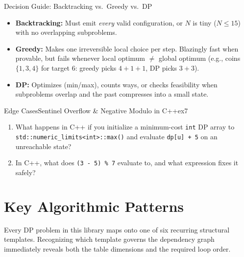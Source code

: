 \documentclass[11pt,a4paper]{article}
\theoremstyle{definition}
\begin{document}
\begin{calloutbox}{Decision Guide: Backtracking vs.\ Greedy vs.\ DP}
\begin{itemize}
    \item \textbf{Backtracking:} Must emit \emph{every} valid configuration, or $N$ is tiny ($N \le 15$) with no overlapping subproblems.
    \item \textbf{Greedy:} Makes one irreversible local choice per step. Blazingly fast when provable, but fails whenever local optimum $\neq$ global optimum (e.g., coins $\{1, 3, 4\}$ for target $6$: greedy picks $4+1+1$, DP picks $3+3$).
    \item \textbf{DP:} Optimizes (min/max), counts ways, or checks feasibility when subproblems overlap and the past compresses into a small state.
\end{itemize}
\end{calloutbox}

\begin{tryitbox}{Edge Cases}{Sentinel Overflow \& Negative Modulo in C++}{ex7}
\begin{enumerate}
    \item What happens in C++ if you initialize a minimum-cost \texttt{int} DP array to \texttt{std::numeric\_limits<int>::max()} and evaluate \texttt{dp[u] + 5} on an unreachable state?
    \item In C++, what does \texttt{(3 - 5) \% 7} evaluate to, and what expression fixes it safely?
\end{enumerate}
\end{tryitbox}

\section{Key Algorithmic Patterns}

Every DP problem in this library maps onto one of six recurring structural templates. Recognizing which template governs the dependency graph immediately reveals both the table dimensions and the required loop order.
\end{document}
